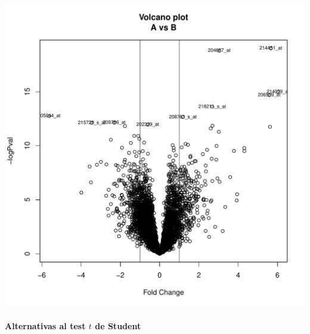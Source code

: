 \documentclass[a4paper]{article}\usepackage[]{graphicx}\usepackage[]{color}
\makeatletter
\def\maxwidth{ %
  \ifdim\Gin@nat@width>\linewidth
    \linewidth
  \else
    \Gin@nat@width
  \fi
}
\newenvironment{knitrout}{}{} %
\makeatother
\begin{document}
\begin{knitrout}
\color{fgcolor}
\includegraphics[width=\maxwidth]{images/graficvolcano1-1} 

\end{knitrout}



\paragraph{Alternativas al test $t$ de Student}
\end{document}
